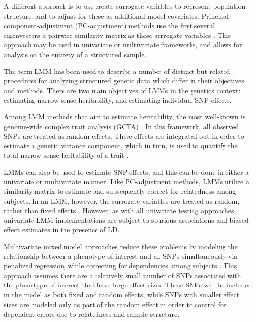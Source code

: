 A different approach is to use create surrogate variables to represent population structure, and to adjust for these as additional model covariates. Principal component-adjustment (PC-adjustment) methods use the first several eigenvectors a pairwise similarity matrix as these surrogate variables \citep{price2006principal}. This approach may be used in univariate or multivariate frameworks, and allows for analysis on the entirety of a structured sample. 

The term LMM has been used to describe a number of distinct but related procedures for analyzing structured genetic data which differ in their objectives and methods. There are two main objectives of LMMs in the genetics context: estimating narrow-sense heritability, and estimating individual SNP effects.

Among LMM methods that aim to estimate heritability, the most well-known is genome-wide complex trait analysis (GCTA) \citep{yang2011gcta}. In this framework, all observed SNPs are treated as random effects. These effects are integrated out in order to estimate a genetic variance component, which in turn, is used to quantify the total narrow-sense heritability of a trait \citep{yang2010common}.

LMMs can also be used to estimate SNP effects, and this can be done in either a univariate or multivariate manner. Like PC-adjustment methods, LMMs utilize a similarity matrix to estimate and subsequently correct for relatedness among subjects. In an LMM, however, the surrogate variables are treated as random, rather than fixed effects \citep{yu2006unified, kang2010variance, kang2008efficient}. However, as with all univariate testing approaches, univariate LMM implementations are subject to spurious associations and biased effect estimates in the presence of LD. 

Multivariate mixed model approaches reduce these problems by modeling the relationship between a phenotype of interest and all SNPs simultaneously via penalized regression, while correcting for dependencies among subjects \citep{rakitsch2013lasso, bhatnagar2020simultaneous}. This approach assumes there are a relatively small number of SNPs associated with the phenotype of interest that have large effect sizes. These SNPs will be included in the model as both fixed and random effects, while SNPs with smaller effect sizes are modeled only as part of the random effect in order to control for dependent errors due to relatedness and sample structure.

